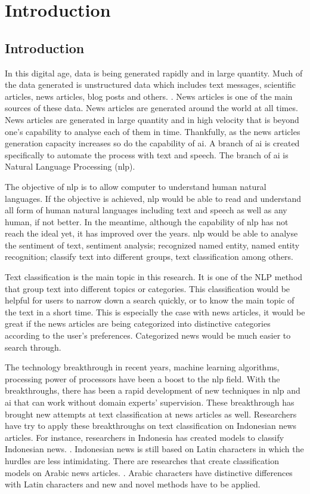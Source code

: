 \chapter{Introduction}
\section{Introduction}
In this digital age, data is being generated rapidly and in large quantity. Much of the data generated is unstructured data which includes text messages, scientific articles, news articles, blog posts and others. \cite{bigData}. News articles is one of the main sources of these data. News articles are generated around the world at all times. News articles are generated in large quantity and in high velocity that is beyond one's capability to analyse each of them in time. Thankfully, as the news articles generation capacity increases so do the capability of \ac{ai}. A branch of \ac{ai} is created specifically to automate the process with text and speech. The branch of \ac{ai} is Natural Language Processing (\ac{nlp}).

The objective of \ac{nlp} is to allow computer to understand human natural languages. If the objective is achieved, \ac{nlp} would be able to read and understand all form of human natural languages including text  and speech as well as any human, if not better. In the meantime, although the capability of \ac{nlp} has not reach the ideal yet, it has improved over the years. \Ac{nlp} would be able to analyse the sentiment of text, sentiment analysis; recognized named entity, named entity recognition; classify text into different groups, text classification among others.

Text classification is the main topic in this research. It is one of the NLP method that group text into different topics or categories. This classification would be helpful for users to narrow down a search quickly, or to know the main topic of the text in a short time. This is especially the case with news articles, it would be great if the news articles are being categorized into distinctive categories according to the user's preferences. Categorized news would be much easier to search through.

The technology breakthrough in recent years, machine learning algorithms, processing power of processors have been a boost to the \ac{nlp} field. With the breakthroughs, there has been a rapid development of new techniques in \ac{nlp} and \ac{ai} that can work without domain experts' supervision. These breakthrough has brought new attempts at text classification at news articles as well. Researchers have try to apply these breakthroughs on text classification on Indonesian news articles. For instance, researchers in Indonesia has created models to classify Indonesian news. \cite{WONGSO2017137}. Indonesian news is still based on Latin characters in which the hurdles are less intimidating. There are researches that create classification models on Arabic news articles. \cite{arabicNews}. Arabic characters have distinctive differences with Latin characters and new and novel methods have to be applied.

